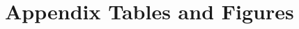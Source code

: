 \documentclass{article}
\begin{document}
\clearpage
\nocite{*}
\printbibliography


\clearpage

\section*{}
\vspace{5mm}

\appendix

\renewcommand\thetable{\thesection.\arabic{table}}    
\renewcommand\thefigure{\thesection.\arabic{figure}} 
\setcounter{table}{0}
\setcounter{figure}{0}

\section{Appendix Tables and Figures}



\end{document}
